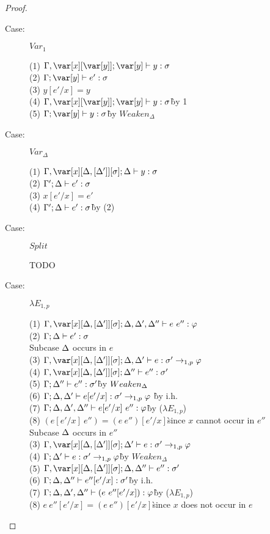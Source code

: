 \begin{proof}
\begin{description}
\item[Case:] $Var_1$
\begin{tabbing}
  (1) $\G,\x[\y]; \y \vdash y : \s$\\
  (2) $\G; \y \vdash e' : \s$\\
  (3) $y[e'/x] = y$\\
  (4) $\G,\x[\y]; \y \vdash y : \s$\`by 1\\ 
  (5) $\G; \y\vdash y : \s$\` by $Weaken_\Delta$\\
\end{tabbing}

\item[Case:] $Var_\Delta$
\begin{tabbing}
    (1) $\G, \xD; \D \vdash y : \s$\\
    (2) $\Gamma'; \Delta \vdash e' : \sigma$\\
    (3) $x[e'/x] = e'$\\
    (4) $\Gamma'; \Delta \vdash e' : \sigma$\` by (2)\\
\end{tabbing}

\item[Case:] $Split$
\begin{tabbing}
    TODO
\end{tabbing}

\item[Case:] $\lambda E_{1,p}$
\begin{tabbing}
    (1) $\G, \xD; \D,\D',\D'' \vdash e~e'' : \varphi$\\
    (2) $\Gamma; \Delta \vdash e' : \sigma$\\
    Subcase $\Delta$ occurs in $e$\\
    (3) $\G, \xD; \D,\D' \vdash e : \s' \to_{1,p} \vp$\\
    (4) $\G, \xD; \D'' \vdash e'' : \s'$\\
    (5) $\Gamma; \Delta'' \vdash e'' : \sigma'$\` by $Weaken_\Delta$\\
    (6) $\Gamma; \Delta,\Delta' \vdash e[e'/x] : \sigma' \to_{1,p} \varphi$ \` by i.h.\\
    (7) $\Gamma;\Delta, \Delta', \Delta'' \vdash e[e'/x]~e'' : \varphi$\` by ($\lambda E_{1,p}$)\\
    (8) $(e[e'/x]~e'')=(e~e'')[e'/x]$\` since $x$ cannot occur in $e''$\\
    Subcase $\Delta$ occurs in $e''$\\
    (3) $\G, \xD; \D' \vdash e : \s' \to_{1,p} \vp$\\
    (4) $\Gamma; \Delta' \vdash e : \sigma' \to_{1,p} \varphi$\` by $Weaken_\Delta$\\
    (5) $\G,\xD; \D, \D'' \vdash e'' : \s'$\\
    (6) $\Gamma; \Delta, \Delta'' \vdash e''[e'/x] : \sigma'$\` by i.h.\\
    (7) $\Gamma; \Delta,\Delta',\Delta'' \vdash (e~e''[e'/x]) : \varphi$\` by ($\lambda E_{1,p}$)\\
    (8) $e~e''[e'/x] = (e~e'')[e'/x]$\`since $x$ does not occur in $e$\\


\end{tabbing}
\end{description}
\end{proof}
